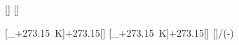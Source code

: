 [\degreeCelsius]
[\degreeCelsius]

[\vartheta_+\SI{273.15}{\kelvin}]{\taX+273.15}[\kelvin]
[\vartheta_+\SI{273.15}{\kelvin}]{\tiX+273.15}[\kelvin]
[]{\TiX/(\TiX-\TaX)}
